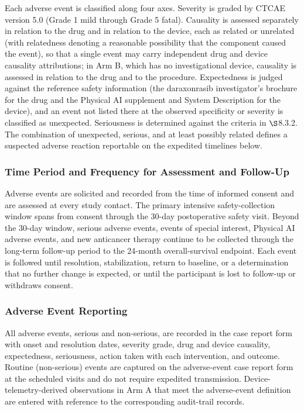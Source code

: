 Each adverse event is classified along four axes. Severity is graded by CTCAE
version 5.0 (Grade 1 mild through Grade 5 fatal). Causality is assessed separately
in relation to the drug and in relation to the device, each as related or unrelated
(with relatedness denoting a reasonable possibility that the component caused the
event), so that a single event may carry independent drug and device causality
attributions; in Arm B, which has no investigational device, causality is assessed
in relation to the drug and to the procedure. Expectedness is judged against the
reference safety information (the daraxonrasib investigator's brochure for the drug
and the Physical AI supplement and System Description for the device), and an event
not listed there at the observed specificity or severity is classified as
unexpected. Seriousness is determined against the criteria in $\S$8.3.2. The
combination of unexpected, serious, and at least possibly related defines a suspected
adverse reaction reportable on the expedited timelines below.

\subsubsection{Time Period and Frequency for Assessment and Follow-Up}

Adverse events are solicited and recorded from the time of informed consent and are
assessed at every study contact. The primary intensive safety-collection window
spans from consent through the 30-day postoperative safety visit. Beyond the 30-day
window, serious adverse events, events of special interest, Physical AI adverse
events, and new anticancer therapy continue to be collected through the long-term
follow-up period to the 24-month overall-survival endpoint. Each event is followed
until resolution, stabilization, return to baseline, or a determination that no
further change is expected, or until the participant is lost to follow-up or
withdraws consent.

\subsubsection{Adverse Event Reporting}

All adverse events, serious and non-serious, are recorded in the case report form
with onset and resolution dates, severity grade, drug and device causality,
expectedness, seriousness, action taken with each intervention, and outcome. Routine
(non-serious) events are captured on the adverse-event case report form at the
scheduled visits and do not require expedited transmission. Device-telemetry-derived
observations in Arm A that meet the adverse-event definition are entered with
reference to the corresponding audit-trail records.

